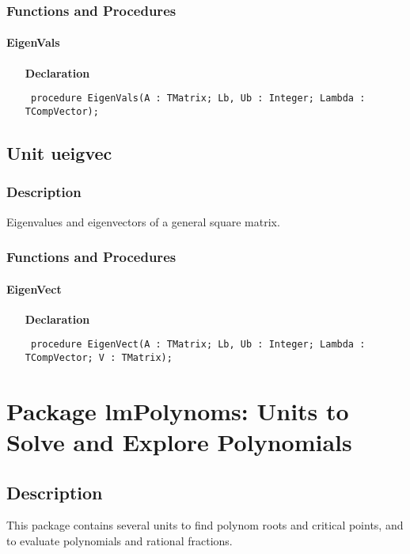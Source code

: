 \documentclass[12pt,a4paper,oneside]{report}
\newcommand{\declarationitem}[1]{\textbf{#1}}
\newcommand{\code}[1]{\texttt{#1}}
\begin{document}
\subsection{Functions and Procedures}
\subsubsection{EigenVals}
\label{ueigval-EigenVals}
\begin{itemize}\item[\declarationitem{Declaration}\hfill]
	\begin{flushleft}
		\code{
			procedure EigenVals(A : TMatrix; Lb, Ub : Integer; Lambda : TCompVector);}
		
	\end{flushleft}
	
\end{itemize}
\section{Unit ueigvec}
\label{ueigvec}
\subsection{Description}
Eigenvalues and eigenvectors of a general square matrix. 
\subsection{Functions and Procedures}
\subsubsection{EigenVect}
\label{ueigvec-EigenVect}
\begin{itemize}\item[\declarationitem{Declaration}\hfill]
	\begin{flushleft}
		\code{
			procedure EigenVect(A : TMatrix; Lb, Ub : Integer; Lambda : TCompVector; V : TMatrix);}
		
	\end{flushleft}
	
\end{itemize}
\chapter[Package lmPolynoms]{Package lmPolynoms: Units to Solve and Explore Polynomials}\label{package-lmPolynoms}
\section{Description}
This package contains several units to find polynom roots and critical points, and to evaluate polynomials and rational fractions.
\end{document}
